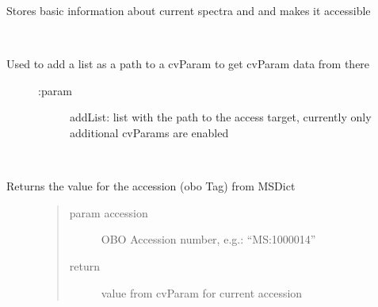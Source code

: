 \documentclass[letterpaper,10pt,english]{sphinxmanual}
\begin{document}
\begin{fulllineitems}
\label{avroSpectrum:avroSpectrum.avroSpectrum}
Stores basic information about current spectra and and makes it accessible

\begin{fulllineitems}
\label{avroSpectrum:avroSpectrum.avroSpectrum.addcvParamLocList}~\begin{description}
\item[{Used to add a list as a path to a cvParam to get cvParam data from there}] \leavevmode\begin{description}
\item[{:param}] \leavevmode
addList: list with the path to the access target, currently only additional cvParams are enabled

\end{description}

\end{description}

\end{fulllineitems}


\begin{fulllineitems}
\label{avroSpectrum:avroSpectrum.avroSpectrum.getByAccession}~\begin{description}
\item[{Returns the value for the accession (obo Tag) from MSDict}] \leavevmode\begin{quote}\begin{description}
\item[{param accession}] \leavevmode
OBO Accession number, e.g.: ``MS:1000014''

\item[{return}] \leavevmode
value from cvParam for current accession

\end{description}\end{quote}

\end{description}

\end{fulllineitems}



\end{fulllineitems}
\end{document}
